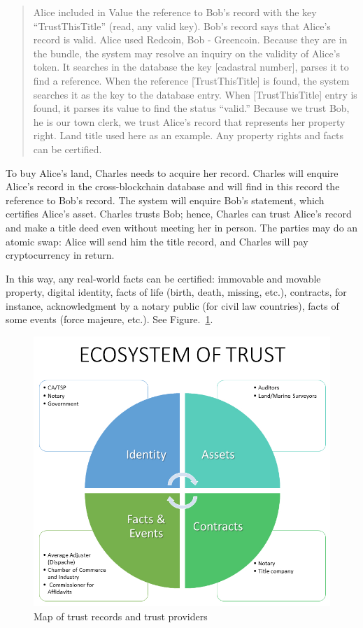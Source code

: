 \begin{multicols}{2}
\begin{quote}
Alice included in Value the reference to Bob’s record with the key “TrustThisTitle” (read, any valid key). Bob’s record says that Alice’s record is valid. Alice used Redcoin, Bob - Greencoin. Because they are in the bundle, the system may resolve an inquiry on the validity of Alice’s token. It searches in the database the key [cadastral number], parses it to find a reference. When the reference [TrustThisTitle] is found, the system searches it as the key to the database entry. When [TrustThisTitle] entry is found, it parses its value to find the status “valid.” Because we trust Bob, he is our town clerk, we trust Alice’s record that represents her property right. Land title used here as an example. Any property rights and facts can be certified.
\end{quote}

To buy Alice’s land, Charles needs to acquire her record. Charles will enquire Alice’s record in the cross-blockchain database and will find in this record the reference to Bob’s record. The system will enquire Bob’s statement, which certifies Alice’s asset. Charles trusts Bob; hence, Charles can trust Alice’s record and make a title deed even without meeting her in person. The parties may do an atomic swap: Alice will send him the title record, and Charles will pay cryptocurrency in return.

In this way, any real-world facts can be certified: immovable and movable property, digital identity, facts of life (birth, death, missing, etc.), contracts, for instance, acknowledgment by a notary public (for civil law countries), facts of some events (force majeure, etc.). See Figure.~\ref{chap1-fig08}.
\begin{figure}[H]
\centering
\includegraphics[scale=1.35]{src/Figures/chap1/chap1-fig08.jpg}
\caption{Map of trust records and trust providers}\label{chap1-fig08}
\end{figure}


\end{multicols}
